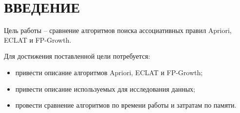 \section*{ВВЕДЕНИЕ}


Цель работы -- сравнение алгоритмов поиска ассоциативных правил Apriori, ECLAT и FP-Growth.

Для достижения поставленной цели потребуется:
\begin{itemize}
	\item привести описание алгоритмов Apriori, ECLAT и FP-Growth;
	\item привести описание используемых для исследования данных;
	\item провести сравнение алгоритмов по времени работы и затратам по памяти.
\end{itemize}

\pagebreak